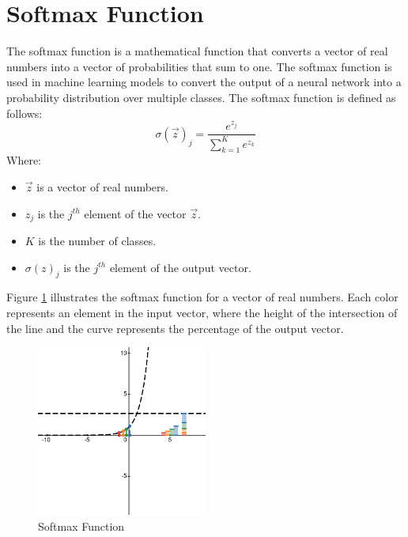 \section{Softmax Function}
The softmax function is a mathematical function that converts a vector of real numbers into a vector of probabilities that sum to one. The softmax function is used in machine learning models to convert the output of a neural network into a probability distribution over multiple classes. The softmax function is defined as follows:
\begin{equation}
    \sigma(\vec{z})_j = \frac{e^{z_j}}{\sum_{k=1}^{K} e^{z_k}}
\end{equation}
Where:
\begin{itemize}[noitemsep]
    \item $\vec{z}$ is a vector of real numbers.
    \item $z_j$ is the $j^{th}$ element of the vector $\vec{z}$.
    \item $K$ is the number of classes.
    \item $\sigma(z)_j$ is the $j^{th}$ element of the output vector.
\end{itemize}
Figure \ref{fig:softmax} illustrates the softmax function for a vector of real numbers. Each color represents an element in the input vector, where the height of the intersection of the line and the curve represents the percentage of the output vector.
\begin{figure}[H]
    \centering
    \includegraphics[width=0.5\textwidth]{assets/desmos-graph.png}
    \caption[Softmax Function]{Softmax Function}
    \label{fig:softmax}
\end{figure}
